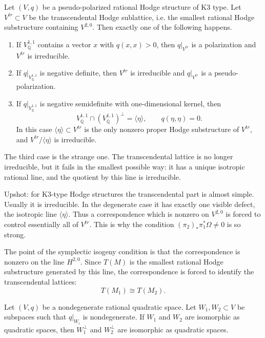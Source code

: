 \documentclass{book}
\begin{document}
\begin{theorem}
\label{theorem-transcendental-k3-type}
Let $(V,q)$ be a pseudo-polarized rational
Hodge structure of K3 type.
Let $V^{tr}\subset V$ be the transcendental
Hodge sublattice, i.e. the smallest rational
Hodge substructure containing $V^{2,0}$.
Then exactly one of the following happens.
\begin{enumerate}
\item If $V^{1,1}_{\mathbb{Q}}$ contains a
vector $x$ with $q(x,x)>0$, then
$q|_{V^{tr}}$ is a polarization and
$V^{tr}$ is irreducible.
\item If $q|_{V^{1,1}_{\mathbb{Q}}}$ is
negative definite, then $V^{tr}$ is
irreducible and
$q|_{V^{tr}}$ is a pseudo-polarization.
\item If $q|_{V^{1,1}_{\mathbb{Q}}}$ is
negative semidefinite with one-dimensional
kernel, then
$$
V^{1,1}_{\mathbb{Q}}\cap
(V^{1,1}_{\mathbb{Q}})^\perp
=\langle\eta\rangle,
\qquad q(\eta,\eta)=0.
$$
In this case $\langle\eta\rangle\subset
V^{tr}$ is the only nonzero proper Hodge
substructure of $V^{tr}$, and
$V^{tr}/\langle\eta\rangle$ is irreducible.
\end{enumerate}
\end{theorem}

\noindent
The third case is the strange one.
The transcendental lattice is no longer
irreducible, but it fails in the smallest
possible way: it has a unique isotropic
rational line, and the quotient by this line
is irreducible.

\medskip
Upshot: for K3-type Hodge structures the
transcendental part is almost simple.
Usually it is irreducible.
In the degenerate case it has exactly one
visible defect, the isotropic line
$\langle\eta\rangle$.
Thus a correspondence which is nonzero on
$V^{2,0}$ is forced to control essentially
all of $V^{tr}$.
This is why the condition
$(\pi_2)_*\pi_1^*\Omega\neq 0$ is so strong.

\begin{lemma}
\label{lemma-sympl-isog-controls-tm}
The point of the symplectic isogeny
condition is that the correspondence is
nonzero on the line $H^{2,0}$.
Since $T(M)$ is the smallest rational Hodge
substructure generated by this line, the
correspondence is forced to identify the
transcendental lattices:
$$
T(M_1)\cong T(M_2).
$$
\end{lemma}

\begin{theorem}[Witt]
\label{theorem-witt-quadratic-spaces}
Let $(V,q)$ be a nondegenerate rational
quadratic space.
Let $W_1,W_2\subset V$ be subspaces such that
$q|_{W_i}$ is nondegenerate.
If $W_1$ and $W_2$ are isomorphic as
quadratic spaces, then
$W_1^\perp$ and $W_2^\perp$ are isomorphic
as quadratic spaces.
\end{theorem}
\end{document}
